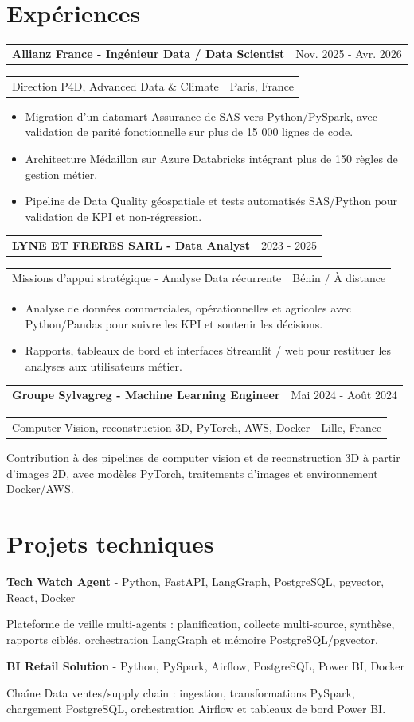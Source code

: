 \documentclass[10pt,a4paper]{article}
\makeatletter
\newcommand{\cvrole}[4]{%
  \vspace{4.2pt}
  \begin{tabularx}{\linewidth}{@{}Xr@{}}
    \textbf{#1} & {\color{accent}#2}
  \end{tabularx}\par\vspace{-4.6pt}
  \begin{tabularx}{\linewidth}{@{}Xr@{}}
    {\color{muted}#3} & {\color{muted}#4}
  \end{tabularx}\par\vspace{-0.4pt}
}
\newcommand{\project}[3]{%
  \textbf{#1} {\color{muted}- #2}\par
  #3\par
}
\makeatother
\begin{document}
\section{Expériences}
\cvrole{Allianz France - Ingénieur Data / Data Scientist}{Nov. 2025 - Avr. 2026}{Direction P4D, Advanced Data \& Climate}{Paris, France}
\begin{itemize}
  \item Migration d'un datamart Assurance de SAS vers Python/PySpark, avec validation de parité fonctionnelle sur plus de 15 000 lignes de code.
  \item Architecture Médaillon sur Azure Databricks intégrant plus de 150 règles de gestion métier.
  \item Pipeline de Data Quality géospatiale et tests automatisés SAS/Python pour validation de KPI et non-régression.
\end{itemize}

\cvrole{LYNE ET FRERES SARL - Data Analyst}{2023 - 2025}{Missions d'appui stratégique - Analyse Data récurrente}{Bénin / À distance}
\begin{itemize}
  \item Analyse de données commerciales, opérationnelles et agricoles avec Python/Pandas pour suivre les KPI et soutenir les décisions.
  \item Rapports, tableaux de bord et interfaces Streamlit / web pour restituer les analyses aux utilisateurs métier.
\end{itemize}

\cvrole{Groupe Sylvagreg - Machine Learning Engineer}{Mai 2024 - Août 2024}{Computer Vision, reconstruction 3D, PyTorch, AWS, Docker}{Lille, France}
Contribution à des pipelines de computer vision et de reconstruction 3D à partir d'images 2D, avec modèles PyTorch, traitements d'images et environnement Docker/AWS.

\section{Projets techniques}
\project{Tech Watch Agent}{Python, FastAPI, LangGraph, PostgreSQL, pgvector, React, Docker}
{Plateforme de veille multi-agents : planification, collecte multi-source, synthèse, rapports ciblés, orchestration LangGraph et mémoire PostgreSQL/pgvector.}

\project{BI Retail Solution}{Python, PySpark, Airflow, PostgreSQL, Power BI, Docker}
{Chaîne Data ventes/supply chain : ingestion, transformations PySpark, chargement PostgreSQL, orchestration Airflow et tableaux de bord Power BI.}
\end{document}
